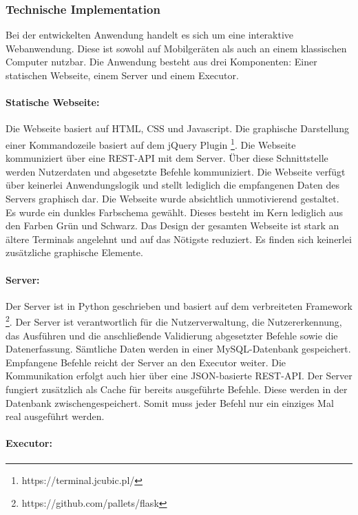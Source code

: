 \subsubsection{Technische Implementation}
Bei der entwickelten Anwendung handelt es sich um eine interaktive Webanwendung. Diese ist sowohl auf Mobilgeräten als auch an einem klassischen Computer nutzbar. Die Anwendung besteht aus drei Komponenten: Einer statischen Webseite, einem Server und einem Executor. 

\paragraph{Statische Webseite:}
Die Webseite basiert auf HTML, CSS und Javascript. Die graphische Darstellung einer Kommandozeile basiert auf dem jQuery Plugin \footnote{https://terminal.jcubic.pl/}. Die Webseite kommuniziert über eine REST-API mit dem Server. Über diese Schnittstelle werden Nutzerdaten und abgesetzte Befehle kommuniziert. Die Webseite verfügt über keinerlei Anwendungslogik und stellt lediglich die empfangenen Daten des Servers graphisch dar. Die Webseite wurde absichtlich unmotivierend gestaltet. Es wurde ein dunkles Farbschema gewählt. Dieses besteht im Kern lediglich aus den Farben Grün und Schwarz. Das Design der gesamten Webseite ist stark an ältere Terminals angelehnt und auf das Nötigste reduziert. Es finden sich keinerlei zusätzliche graphische Elemente.

\paragraph{Server:}
Der Server ist in Python geschrieben und basiert auf dem verbreiteten Framework \footnote{https://github.com/pallets/flask}. Der Server ist verantwortlich für die Nutzerverwaltung, die Nutzererkennung, das Ausführen und die anschließende Validierung abgesetzter Befehle sowie die Datenerfassung. Sämtliche Daten werden in einer MySQL-Datenbank gespeichert. Empfangene Befehle reicht der Server an den Executor weiter. Die Kommunikation erfolgt auch hier über eine JSON-basierte REST-API. Der Server fungiert zusätzlich als Cache für bereits ausgeführte Befehle. Diese werden in der Datenbank zwischengespeichert. Somit muss jeder Befehl nur ein einziges Mal real ausgeführt werden.

\paragraph{Executor:}


